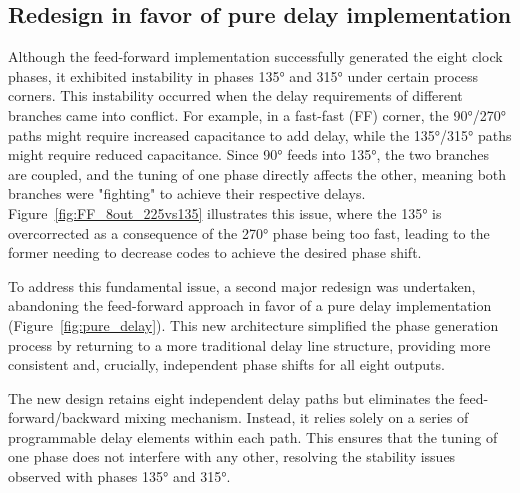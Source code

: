 \subsection{Redesign in favor of pure delay implementation}\label{sec:second_redesign}

Although the feed-forward implementation successfully generated the eight clock phases, it exhibited instability in phases \ang{135} and \ang{315} under certain process corners. This instability occurred when the delay requirements of different branches came into conflict. For example, in a fast-fast (FF) corner, the \ang{90}/\ang{270} paths might require increased capacitance to add delay, while the \ang{135}/\ang{315} paths might require reduced capacitance. Since \ang{90} feeds into \ang{135}, the two branches are coupled, and the tuning of one phase directly affects the other, meaning both branches were "fighting" to achieve their respective delays. Figure~\ref{fig:FF_8out_225vs135} illustrates this issue, where the \ang{135} is overcorrected as a consequence of the \ang{270} phase being too fast, leading to the former needing to decrease codes to achieve the desired phase shift.

To address this fundamental issue, a second major redesign was undertaken, abandoning the feed-forward approach in favor of a pure delay implementation (Figure~\ref{fig:pure_delay}). This new architecture simplified the phase generation process by returning to a more traditional delay line structure, providing more consistent and, crucially, independent phase shifts for all eight outputs.

The new design retains eight independent delay paths but eliminates the feed-forward/backward mixing mechanism. Instead, it relies solely on a series of programmable delay elements within each path. This ensures that the tuning of one phase does not interfere with any other, resolving the stability issues observed with phases \ang{135} and \ang{315}.



